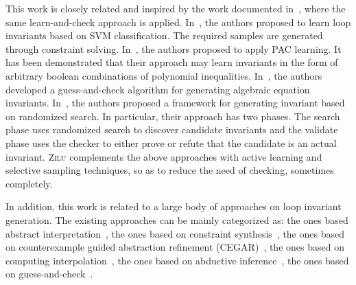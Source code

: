 This work is closely related and inspired by the work documented in~\cite{sharma2012interpolants,sharma2013verification,DBLP:conf/esop/0001GHALN13,sharma2014invariant}, where the same learn-and-check approach is applied. 
In~\cite{sharma2012interpolants}, the authors proposed to learn loop invariants based on SVM classification. The required samples are generated through constraint solving. In~\cite{sharma2013verification}, the authors proposed to apply PAC learning. It has been demonstrated that their approach may learn invariants in the form of arbitrary boolean
combinations of polynomial inequalities. In~\cite{DBLP:conf/esop/0001GHALN13}, the authors developed a guess-and-check algorithm for generating algebraic equation invariants. In~\cite{sharma2014invariant}, the authors proposed a framework for generating invariant based on randomized search. In particular, their approach has two phases. The search phase uses randomized search to discover candidate invariants and the validate phase uses the checker to either prove or refute that the candidate is an actual invariant. \textsc{Zilu} complements the above approaches with active learning and selective sampling techniques, so as to reduce the need of checking, sometimes completely.

In addition, this work is related to a large body of approaches on loop invariant generation. The existing approaches can be mainly categorized as:
the ones based abstract interpretation~\cite{cousot1978automatic,mine2006octagon,cousot1979systematic,karr1976affine,vincent2009subpolyhedra}, the ones based on
constraint synthesis~\cite{ashutosh2009invgen,michael2003linear,sumit2009constraint}, the ones based on
counterexample guided abstraction refinement (CEGAR)~\cite{henzinger2003software,thomas2001slam,edmund2003counterexample}, the ones based on 
computing interpolation~\cite{kenneth2010lazy,thomas2004abstractions,kenneth2003interpolation,Kenneth2006lazy}, the ones based on abductive inference~\cite{isil2013inductive}, the ones based on 
guess-and-check~\cite{cormac2001houdini,ernst2007daikon}.

